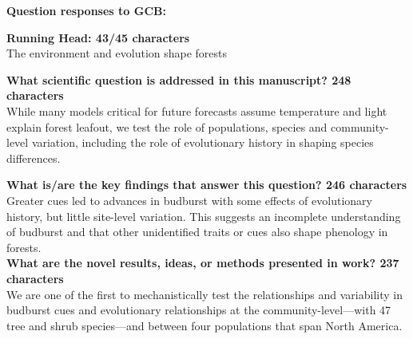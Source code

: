 \documentclass{letter}
\begin{document}
\textbf{Question responses to GCB:}


\textbf{Running Head: 43/45 characters}\\

The environment and evolution shape forests 


\textbf{What scientific question is addressed in this manuscript? 248 characters}\\


While many models critical for future forecasts assume temperature and light explain forest leafout, we test the role of populations, species and community-level variation, including the role of evolutionary history in shaping species differences. 

\textbf{What is/are the key findings that answer this question? 246 characters}\\

Greater cues led to advances in budburst with some effects of evolutionary history, but little site-level variation. This suggests an incomplete understanding of budburst and that other unidentified traits or cues also shape phenology in forests.\\

\textbf{What are the novel results, ideas, or methods presented in work? 237 characters}\\
We are one of the first to mechanistically test the relationships and variability in budburst cues and evolutionary relationships at the community-level—with 47 tree and shrub species—and between four populations that span North America. 
\end{document}
